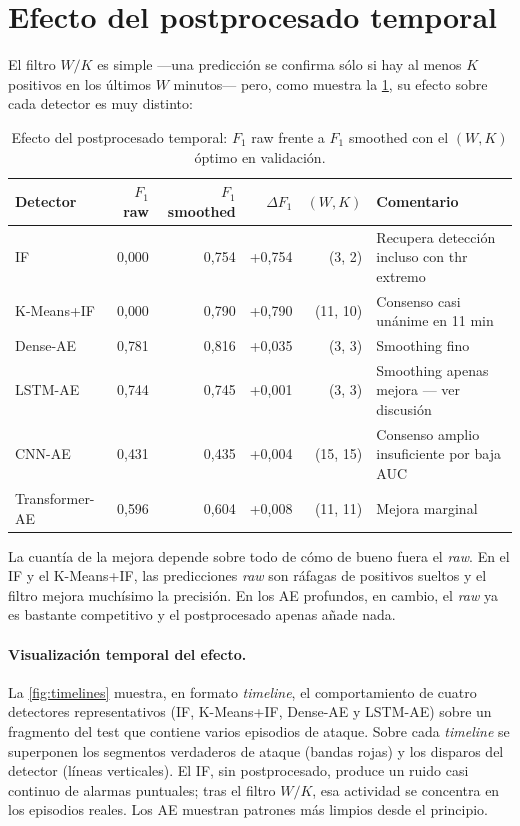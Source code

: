 \section{Efecto del postprocesado temporal}
\label{sec:resultados-temporal}

El filtro $W/K$ es simple ---una predicción se confirma sólo si hay al menos $K$ positivos en los últimos $W$ minutos--- pero, como muestra la \cref{tab:wk-effect}, su efecto sobre cada detector es muy distinto:

\begin{table}[H]
\centering
\caption{Efecto del postprocesado temporal: $F_1$ raw frente a $F_1$ smoothed con el $(W, K)$ óptimo en validación.}
\label{tab:wk-effect}
\footnotesize
\begin{tabularx}{\textwidth}{l r r r r X}
\toprule
Detector & $F_1$ raw & $F_1$ smoothed & $\Delta F_1$ & $(W, K)$ & Comentario \\
\midrule
IF                 & 0{,}000 & 0{,}754 & +0{,}754 & (3, 2)   & Recupera detección incluso con thr extremo \\
K-Means+IF         & 0{,}000 & 0{,}790 & +0{,}790 & (11, 10) & Consenso casi unánime en 11 min \\
Dense-AE           & 0{,}781 & 0{,}816 & +0{,}035 & (3, 3)   & Smoothing fino \\
LSTM-AE            & 0{,}744 & 0{,}745 & +0{,}001 & (3, 3)   & Smoothing apenas mejora — ver discusión \\
CNN-AE             & 0{,}431 & 0{,}435 & +0{,}004 & (15, 15) & Consenso amplio insuficiente por baja AUC \\
Transformer-AE     & 0{,}596 & 0{,}604 & +0{,}008 & (11, 11) & Mejora marginal \\
\bottomrule
\end{tabularx}
\end{table}

La cuantía de la mejora depende sobre todo de cómo de bueno fuera el \textit{raw}. En el IF y el K-Means+IF, las predicciones \textit{raw} son ráfagas de positivos sueltos y el filtro mejora muchísimo la precisión. En los AE profundos, en cambio, el \textit{raw} ya es bastante competitivo y el postprocesado apenas añade nada.

\paragraph{Visualización temporal del efecto.} La \cref{fig:timelines} muestra, en formato \emph{timeline}, el comportamiento de cuatro detectores representativos (IF, K-Means+IF, Dense-AE y LSTM-AE) sobre un fragmento del test que contiene varios episodios de ataque. Sobre cada \emph{timeline} se superponen los segmentos verdaderos de ataque (bandas rojas) y los disparos del detector (líneas verticales). El IF, sin postprocesado, produce un ruido casi continuo de alarmas puntuales; tras el filtro $W/K$, esa actividad se concentra en los episodios reales. Los AE muestran patrones más limpios desde el principio.


